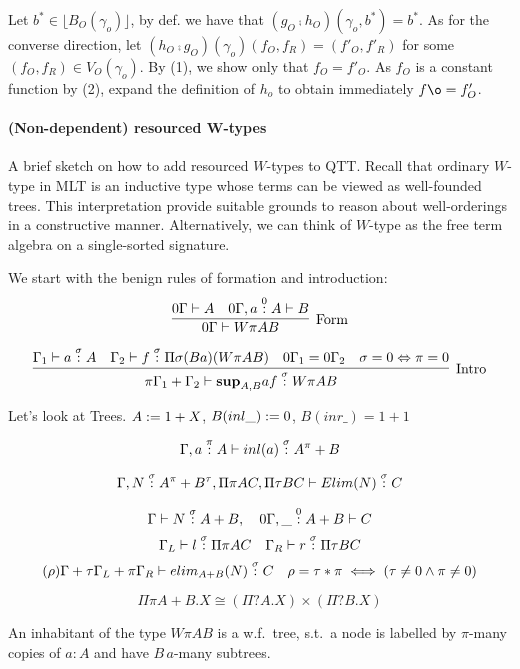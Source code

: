\documentclass[12pt,a4paper]{article}
\renewcommand{\O}{_{O}}\alwaysmath{O}
\newcommand{\R}{\ensuremath{_{R}}}
\begin{document}
Let $b^* \in \lfloor B\O(\gamma_o) \rfloor$, by def. we have that $ (g\O \comp h\O)(\gamma_o, b^*) = b^*$. As for the converse direction, let $(h\O \comp  g\O)(\gamma_o)(f\O, f\R)=(f'\O, f'\R)$ for some $(f\O, f\R) \in V\O(\gamma_o)$. By (1), we show only that $f\O = f'\O$. As $f\O$ is a constant function by (2), expand the definition of $h_o$ to obtain immediately $f\o = f'\O$.

\newpage
\paragraph*{(Non-dependent) resourced W-types\\} A brief sketch on how to add resourced $W$-types to QTT. Recall that ordinary $W$-type in MLT is an inductive type whose terms can be viewed as well-founded trees. This interpretation provide suitable grounds to reason about well-orderings in a constructive manner. Alternatively, we can think of $W$-type as the free term algebra on a single-sorted signature.

We start with the benign rules of formation and introduction:
$$
\infer[\text{Form}]{0\Gamma \vdash W\pi A B}{
  0\Gamma \vdash A  
  &
  0\Gamma, a \overset{0}: A \vdash B 
}
$$

$$
\infer[\text{Intro}]{\pi \Gamma_1 + \Gamma_2 \vdash \mathbf{sup}_{A,B} a f \of{\sigma} W\pi A B}{
  \Gamma_1 \vdash a \of\sigma A  
  &
  \Gamma_2 \vdash f \of{\sigma}  \Pi \sigma (B a) (W \pi A B)
  & 
  0 \Gamma_1 = 0 \Gamma_2
  &
  \sigma = 0 \Leftrightarrow \pi = 0
}
$$

Let's look at Trees. $A := 1 + X$, $B(inl \_) := 0$, $B(inr \_) = 1 + 1$

$$\Gamma , a \overset{\pi}{:} A \vdash inl(a) \overset{\sigma}{:} A^{\pi}+ B$$

$$ \Gamma , N \overset{\sigma}{:}{A^\pi + B^\tau} , \Pi \pi A C, \Pi \tau B C \vdash Elim(N) \overset{\sigma}{:} C$$

$$ \Gamma \vdash N \overset{\sigma}{:} A + B, \quad 0\Gamma, \_ \overset{0}{:} A+B \vdash C$$
$$ \Gamma_L \vdash l \overset{\sigma}{:} \Pi \pi A C \quad \Gamma_R \vdash r \overset{\sigma}{:} \Pi \tau B C$$
$$ (\rho) \Gamma + \tau \Gamma_L + \pi \Gamma_R \vdash elim_{A + B }(N) \overset{\sigma}{:} C \quad \rho = \tau * \pi \iff (\tau \neq 0 \land \pi \neq 0) $$  

$$ \Pi \pi A + B . X \cong (\Pi ? A . X) \times (\Pi ? B . X)$$

An inhabitant of the type $W \pi A B$ is a w.f.\ tree, s.t.\ a node is labelled by $\pi$-many copies of $a : A$ and have $B\, a$-many subtrees.
\end{document}
